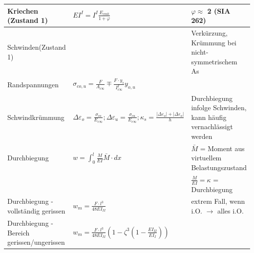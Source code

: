 	\begin{minipage}{0.5\linewidth}
		

		
		\begin{tabular}{p{0.35\linewidth}|p{0.4\linewidth}|p{0.3\linewidth}}
		
							
			Kriechen (Zustand 1) & $ EI^I = I^I \frac{E_{cm0}}{1 + \varphi} $	& $ \varphi \approx $ 2 (SIA 262) \\ \hline
			
			Schwinden(Zustand 1) &  & Verkürzung, Krümmung bei nicht-symmetrischem As \\
			Randspannungen	& $ \sigma_{co,u} = \frac{F}{A_{i \infty}} \mp \frac{F \cdot y_s}{I^I_{i \infty} } y_{o, u} $	& \\
			Schwindkrümmung	& $ \Delta \varepsilon_o = \frac{ \sigma_{co} }{E_{c \infty} }; \Delta \varepsilon_u = \frac{ \sigma_{cu} }{E_{c \infty} }; \kappa_s = \frac{|\Delta \varepsilon_o| + |\Delta \varepsilon_o|}{h} $ & Durchbiegung infolge Schwinden, kann häufig vernachlässigt werden \\ \hline

			
			Durchbiegung	& $ w = \int_{0}^{l} \frac{M}{EI} \bar{M} \cdot dx $	& $ \bar{M} $ = Moment aus virtuellem Belastungszustand \\
						&	& $ \frac{M}{EI} = \kappa $ = Durchbiegung \\ \hline
			
			Durchbiegung - vollständig gerissen & $ w_m = \frac{F \cdot l^3}{48EI_{II} } $	& extrem Fall, wenn i.O. $\rightarrow$ alles i.O. \\ \hline
			
			Durchbiegung - Bereich gerissen/ungerissen	& $ w_m = \frac{F \cdot l^3}{48EI_{II} } (1 - \zeta^3 (1 - \frac{EI_{II}}{EI_I} ) ) $ & \\
			
			
		\end{tabular}
		
		
	\end{minipage}